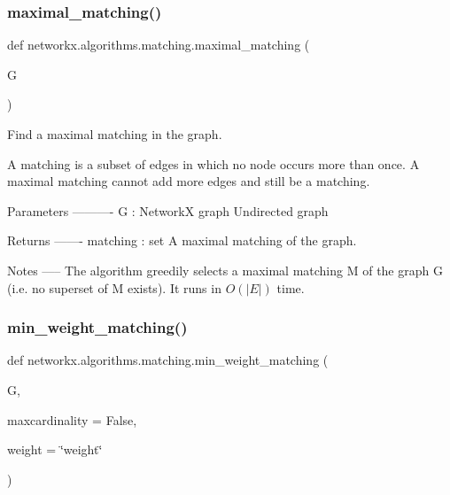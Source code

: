 \subsubsection{\texorpdfstring{maximal\+\_\+matching()}{maximal\_matching()}}
{\footnotesize\ttfamily def networkx.\+algorithms.\+matching.\+maximal\+\_\+matching (\begin{DoxyParamCaption}\item[{}]{G }\end{DoxyParamCaption})}

\begin{DoxyVerb}Find a maximal matching in the graph.

A matching is a subset of edges in which no node occurs more than once.
A maximal matching cannot add more edges and still be a matching.

Parameters
----------
G : NetworkX graph
    Undirected graph

Returns
-------
matching : set
    A maximal matching of the graph.

Notes
-----
The algorithm greedily selects a maximal matching M of the graph G
(i.e. no superset of M exists). It runs in $O(|E|)$ time.
\end{DoxyVerb}
 \mbox{\label{namespacenetworkx_1_1algorithms_1_1matching_aa5a195508672b45c70e8f70c7086657f}} 
\subsubsection{\texorpdfstring{min\+\_\+weight\+\_\+matching()}{min\_weight\_matching()}}
{\footnotesize\ttfamily def networkx.\+algorithms.\+matching.\+min\+\_\+weight\+\_\+matching (\begin{DoxyParamCaption}\item[{}]{G,  }\item[{}]{maxcardinality = {\ttfamily False},  }\item[{}]{weight = {\ttfamily \char`\"{}weight\char`\"{}} }\end{DoxyParamCaption})}

